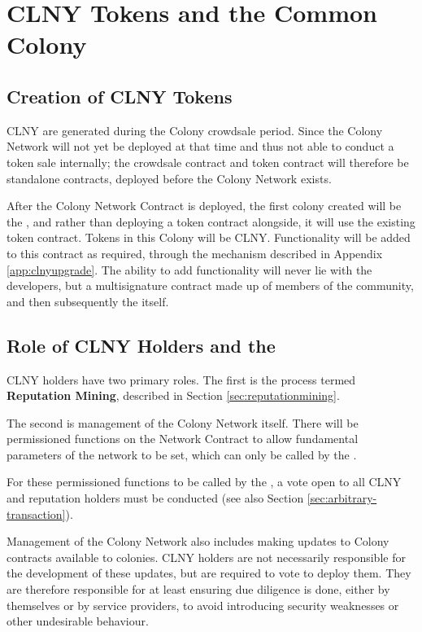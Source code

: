 \section{CLNY Tokens and the Common Colony}\label{sec:clny}

\subsection{Creation of CLNY Tokens}
CLNY are generated during the Colony crowdsale period. Since the Colony Network will not yet be deployed at that time and thus not able to conduct a token sale internally; the crowdsale contract and token contract will therefore be standalone contracts, deployed before the Colony Network exists.
 
After the Colony Network Contract is deployed, the first colony created will be the \rc, and rather than deploying a token contract alongside, it will use the existing token contract. Tokens in this Colony will be CLNY. Functionality will be added to this contract as required, through the mechanism described in Appendix \ref{app:clnyupgrade}. The ability to add functionality will never lie with the developers, but a multisignature contract made up of members of the community, and then subsequently the \rc itself.

\subsection{Role of CLNY Holders and the \rc}
CLNY holders have two primary roles. The first is the process termed \textbf{Reputation Mining}, described in Section \ref{sec:reputationmining}.

The second is management of the Colony Network itself. There will be permissioned functions on the Network Contract to allow fundamental parameters of the network to be set, which can only be called by the \rc.

For these permissioned functions to be called by the \rc, a vote open to all CLNY and reputation holders must be conducted  (see also Section \ref{sec:arbitrary-transaction}).

Management of the Colony Network also includes making updates to Colony contracts available to colonies. CLNY holders are not necessarily responsible for the development of these updates, but are required to vote to deploy them. They are therefore responsible for at least ensuring due diligence is done, either by themselves or by service providers, to avoid introducing security weaknesses or other undesirable behaviour.

